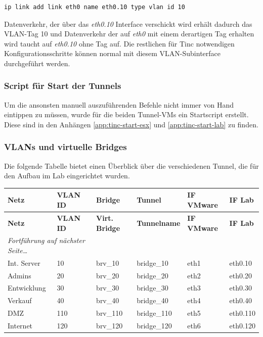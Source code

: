 \begin{lstlisting}
ip link add link eth0 name eth0.10 type vlan id 10
\end{lstlisting}

Datenverkehr, der über das \emph{eth0.10} Interface verschickt wird erhält dadurch das VLAN-Tag 10 und Datenverkehr der auf \emph{eth0} mit einem derartigen Tag erhalten wird taucht auf \emph{eth0.10} ohne Tag auf. Die restlichen für Tinc notwendigen Konfigurationsschritte können normal mit diesem VLAN-Subinterface durchgeführt werden.

\subsubsection{Script für Start der Tunnels}
Um die ansonsten manuell auszuführenden Befehle nicht immer von Hand eintippen zu müssen, wurde für die beiden Tunnel-VMs ein Startscript erstellt. Diese sind in den Anhängen \ref{app:tinc-start-esx} und \ref{app:tinc-start-lab} zu finden.

\subsubsection{VLANs und virtuelle Bridges}
Die folgende Tabelle bietet einen Überblick über die verschiedenen Tunnel, die für den Aufbau im Lab eingerichtet wurden.

\begin{longtable}{p{2.5cm}|p{2cm}|p{1.5cm}|p{2cm}|p{2.5cm}|p{2cm}}
	\textbf{Netz} & \textbf{VLAN ID} & \textbf{Bridge} & \textbf{Tunnel} & \textbf{IF VMware} & \textbf{IF Lab}\\
	\hline
	\endfirsthead
	\textbf{Netz} & \textbf{VLAN ID} & \textbf{Virt. Bridge} & \textbf{Tunnelname} & \textbf{IF VMware} & \textbf{IF Lab}\\
	\hline
	\endhead
	\hline
	\multicolumn{2}{l}{\textit{Fortführung auf nächster Seite\ldots}} \\
	\endfoot
	\endlastfoot
	Int. Server & 10 & brv\_10 & bridge\_10 & eth1 & eth0.10 \\
	Admins & 20 & brv\_20 & bridge\_20 & eth2 & eth0.20 \\
	Entwicklung & 30 & brv\_30 & bridge\_30 & eth3 & eth0.30 \\
	Verkauf & 40 & brv\_40 & bridge\_40 & eth4 & eth0.40 \\
	DMZ & 110 & brv\_110 & bridge\_110 & eth5 & eth0.110 \\
	Internet & 120 & brv\_120 & bridge\_120 & eth6 & eth0.120
\end{longtable}
